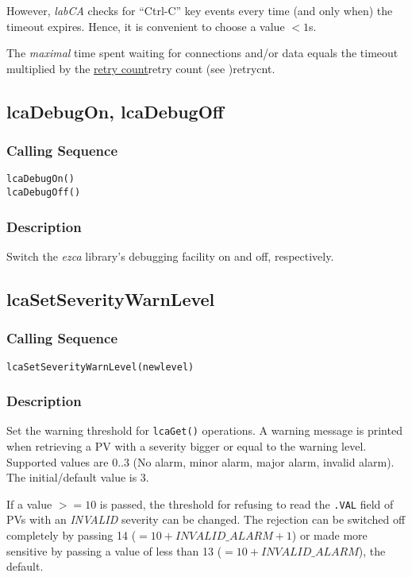 \documentclass{article}
\newcommand{\sca}{\ita{labCA}}
\newcommand{\ezca}{\ita{ezca}}
\newcommand{\com}[1]{{\tt #1}}
\newcommand{\pbrk}{\pagebreak[3]}
\newcommand{\ita}[1]{\emph{#1}}
\newcommand{\sevrange}{$0..3$}
\renewcommand{\sevrange}{0..3}
\renewcommand{\pbrk}{}
\begin{document}
However, \sca{} checks for ``Ctrl-C'' key events every time
(and only when) the timeout expires. Hence, it is convenient to
choose a value $<1$s.

The {\em maximal} time spent waiting for connections and/or data equals the
timeout multiplied by the
\hyperref[ref]{retry count}{retry count (see }{ )}{retrycnt}.

\vspace*{\fill}
\pbrk
\subsection{lcaDebugOn, lcaDebugOff}
\subsubsection{Calling Sequence}
\begin{verbatim}
lcaDebugOn()
lcaDebugOff()
\end{verbatim}
\subsubsection{Description}
Switch the \ezca{} library's debugging facility on and off, respectively.

\vspace*{\fill}
\pbrk
\subsection{lcaSetSeverityWarnLevel}
\label{swarnlevel}
\subsubsection{Calling Sequence}
\begin{verbatim}
lcaSetSeverityWarnLevel(newlevel)
\end{verbatim}
\subsubsection{Description}
Set the warning threshold for \com{lcaGet()} operations.
A warning message is printed when retrieving a PV with a severity bigger
or equal to the warning level. Supported values are \sevrange{} (No alarm,
minor alarm, major alarm, invalid alarm). The initial/default value is 3.

If a value $>=10$ is passed, the threshold for refusing to read the \com{.VAL}
field of PVs with an \ita{INVALID} severity can be changed. The rejection
can be switched off completely by passing 14 ($= 10 + INVALID\_ALARM + 1$)
or made more sensitive by passing a value of less than 13 ($=10 + INVALID\_ALARM$),
the default.
\end{document}
